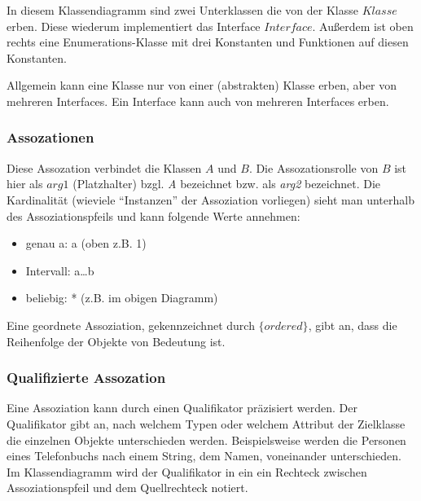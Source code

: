 \documentclass{panikzettel}
\begin{document}
In diesem Klassendiagramm sind zwei Unterklassen die von der Klasse $\textit{Klasse}$ erben. Diese wiederum implementiert das Interface $\textit{Interface}$. Außerdem ist oben rechts eine Enumerations-Klasse mit drei Konstanten und Funktionen auf diesen Konstanten.

Allgemein kann eine Klasse nur von einer (abstrakten) Klasse erben, aber von mehreren Interfaces. Ein Interface kann auch von mehreren Interfaces erben.

\subsubsection{Assozationen}

Diese Assozation verbindet die Klassen $\textit{A}$ und $\textit{B}$. Die Assozationsrolle von $\textit{B}$ ist hier als $\textit{arg1}$ (Platzhalter) bzgl. \textit{A} bezeichnet bzw. als \textit{arg2} bezeichnet. Die Kardinalität (wieviele ``Instanzen''  der Assoziation vorliegen) sieht man unterhalb des Assoziationspfeils und kann folgende Werte annehmen:
\begin{itemize}
\item genau a: a (oben z.B. 1)
\item Intervall: a\ldots b
\item beliebig: * (z.B. im obigen Diagramm)
\end{itemize}

Eine geordnete Assoziation, gekennzeichnet durch $\textit{\{ordered\}}$, gibt an, dass die Reihenfolge der Objekte von Bedeutung ist.

\subsubsection{Qualifizierte Assozation}
Eine Assoziation kann durch einen Qualifikator präzisiert werden.
Der Qualifikator gibt an, nach welchem Typen oder welchem Attribut der Zielklasse die einzelnen Objekte unterschieden werden.
Beispielsweise werden die Personen eines Telefonbuchs nach einem String, dem Namen, voneinander unterschieden. 
Im Klassendiagramm wird der Qualifikator in ein ein Rechteck zwischen Assoziationspfeil und dem Quellrechteck notiert. 
\end{document}
